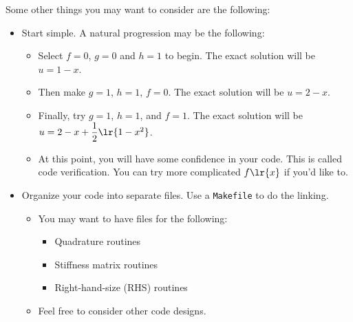 \documentclass[11pt]{article}
\begin{document}
  Some other things you may want to consider are the following:
  \begin{itemize}
    \item Start simple.  A natural progression may be the following:
      \begin{itemize}
        \item Select $f = 0$, $g = 0$ and $h = 1$ to begin.  The exact solution will be $u = 1 - x$.
        \item Then make $g = 1$, $h = 1$, $f = 0$.  The exact solution will be $u = 2 - x$.
        \item Finally, try $g = 1$, $h = 1$, and $f = 1$.  The exact solution will be $u = 2 - x + \dfrac{1}{2}\lr{1 -
x^{2}}$.
        \item At this point, you will have some confidence in your code.  This is called code verification.  You can try more
complicated $f\lr{x}$ if you'd like to.
      \end{itemize}
    \item Organize your code into separate files.  Use a \texttt{Makefile} to do the linking.
      \begin{itemize}
        \item You may want to have files for the following:
          \begin{itemize}
            \item Quadrature routines 
            \item Stiffness matrix routines 
            \item Right-hand-size (RHS) routines
          \end{itemize}
        \item Feel free to consider other code designs.
      \end{itemize}
  \end{itemize}
  
   
\end{document}
